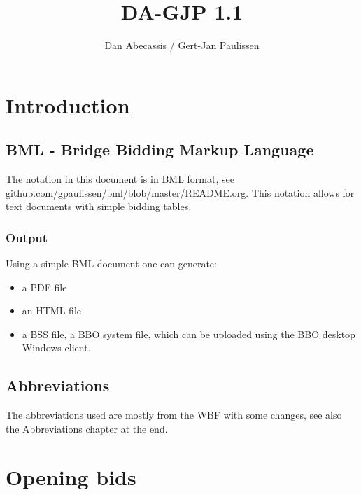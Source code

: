 \documentclass[a4paper]{article}
\title{DA-GJP 1.1}
\author{Dan Abecassis / Gert-Jan Paulissen}
\begin{document}
\maketitle
\tableofcontents

\section{Introduction}

\subsection{BML - Bridge Bidding Markup Language}

The notation in this document is in BML format, see
github.com/gpaulissen/bml/blob/master/README.org.
\bigbreak
This notation allows for text documents with simple bidding tables.
\bigbreak
\subsubsection{Output}

Using a simple BML document one can generate:
\bigbreak
\begin{itemize}
\item a PDF file

\item an HTML file

\item a BSS file, a BBO system file, which can be uploaded using the BBO desktop Windows client.

\end{itemize}
\bigbreak
\subsection{Abbreviations}

The abbreviations used are mostly from the WBF with some changes, see also the
Abbreviations chapter at the end.
\bigbreak
\section{Opening bids}
\end{document}
